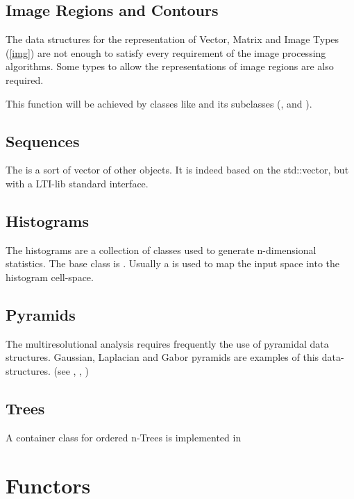 \subsection{Image Regions and Contours}\label{regions}


The data structures for the representation of Vector, Matrix and Image Types
(\ref{img}) are not enough to satisfy every requirement of the image
processing algorithms. Some types to allow the representations of image
regions are also required.

This function will be achieved by classes like  and its
subclasses (,  and
).

\subsection{Sequences}\label{sequences}

The  is a sort of vector of other objects. It is indeed based on the std::vector, but with a LTI-lib standard interface.

\subsection{Histograms}\label{histograms}
The histograms are a collection of classes used to generate n-dimensional
statistics. The base class is . Usually a
 is used to map the input space into the histogram
cell-space.

\subsection{Pyramids}\label{pyramids}
The multiresolutional analysis requires frequently the use of pyra\-mi\-dal
data structures. Gaussian, Laplacian and Gabor pyr\-a\-mids are examples of
this data-structures. (see ,
, )

\subsection{Trees}\label{trees}
 A container class for ordered n-Trees is implemented in 

\section{Functors}\label{functors}

